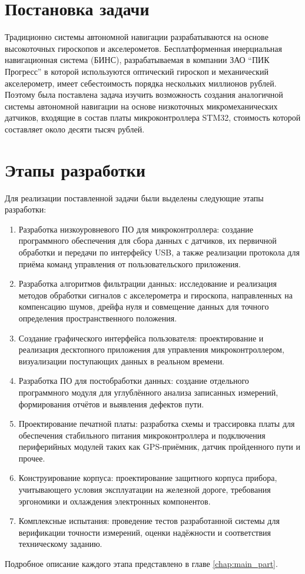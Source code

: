 \section{Постановка задачи}

Традиционно системы автономной навигации разрабатываются на основе высокоточных гироскопов и акселерометов. Бесплатформенная инерциальная навигационная система (БИНС), разрабатываемая в компании ЗАО \enquote{ПИК Прогресс} в которой используются оптический гироскоп и механический акселерометр, имеет себестоимость порядка нескольких миллионов рублей.
Поэтому была поставлена задача изучить возможность создания аналогичной системы автономной навигации на основе низкоточных микромеханических датчиков, входящие в состав платы микроконтроллера STM32, стоимость которой составляет около десяти тысяч рублей.


\section{Этапы разработки}
Для реализации поставленной задачи были выделены следующие этапы разработки:

\begin{enumerate}
	\item Разработка низкоуровневого ПО для микроконтроллера: создание программного обеспечения для сбора данных с датчиков, их первичной обработки и передачи по интерфейсу USB, а также реализации протокола для приёма команд управления от пользовательского приложения.
	
	\item Разработка алгоритмов фильтрации данных: исследование и реализация методов обработки сигналов с акселерометра и гироскопа, направленных на компенсацию шумов, дрейфа нуля и совмещение данных для точного определения пространственного положения.
	
	\item Создание графического интерфейса пользователя: проектирование и реализация десктопного приложения для управления микроконтроллером, визуализации поступающих данных в реальном времени.
	
	\item Разработка ПО для постобработки данных: создание отдельного программного модуля для углублённого анализа записанных измерений, формирования отчётов и выявления дефектов пути.
	
	\item Проектирование печатной платы: разработка схемы и трассировка платы для обеспечения стабильного питания микроконтроллера и подключения периферийных модулей таких как GPS-приёмник, датчик пройденного пути и прочее.
	
	\item Конструирование корпуса: проектирование защитного корпуса прибора, учитывающего условия эксплуатации на железной дороге, требования эргономики и охлаждения электронных компонентов.
	
	\item Комплексные испытания: проведение тестов разработанной системы для верификации точности измерений, оценки надёжности и соответствия техническому заданию.
\end{enumerate}

Подробное описание каждого этапа представлено в главе \ref{chap:main_part}.